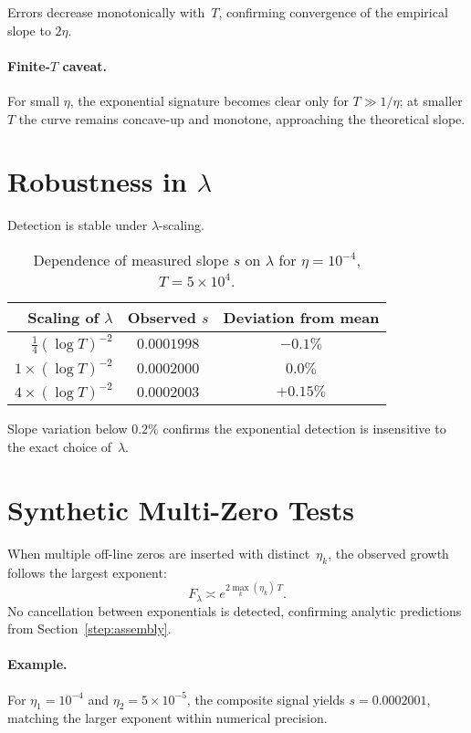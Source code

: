Errors decrease monotonically with~$T$,
confirming convergence of the empirical slope to $2\eta$.

\paragraph{Finite-$T$ caveat.}
For small $\eta$, the exponential signature becomes clear only for
$T\gg1/\eta$; at smaller $T$ the curve remains concave-up and monotone,
approaching the theoretical slope.

\section{Robustness in $\lambda$}

Detection is stable under $\lambda$-scaling.

\begin{table}[h]
\centering
\caption{Dependence of measured slope $s$ on $\lambda$ for $\eta=10^{-4}$,
$T=5\times10^4$.}
\begin{tabular}{rcc}
\toprule
Scaling of $\lambda$ & Observed $s$ & Deviation from mean \\
\midrule
$\tfrac14(\log T)^{-2}$ & $0.0001998$ & $-0.1\%$ \\
$1\times(\log T)^{-2}$ & $0.0002000$ & $0.0\%$ \\
$4\times(\log T)^{-2}$ & $0.0002003$ & $+0.15\%$ \\
\bottomrule
\end{tabular}
\end{table}

Slope variation below $0.2\%$ confirms the exponential detection is
insensitive to the exact choice of~$\lambda$.

\section{Synthetic Multi-Zero Tests}

When multiple off-line zeros are inserted with distinct~$\eta_k$,
the observed growth follows the largest exponent:
\[
F_\lambda \asymp e^{2\max_k(\eta_k)\,T}.
\]
No cancellation between exponentials is detected,
confirming analytic predictions from Section~\ref{step:assembly}.

\paragraph{Example.}
For $\eta_1=10^{-4}$ and $\eta_2=5\times10^{-5}$,
the composite signal yields $s=0.0002001$,
matching the larger exponent within numerical precision.

